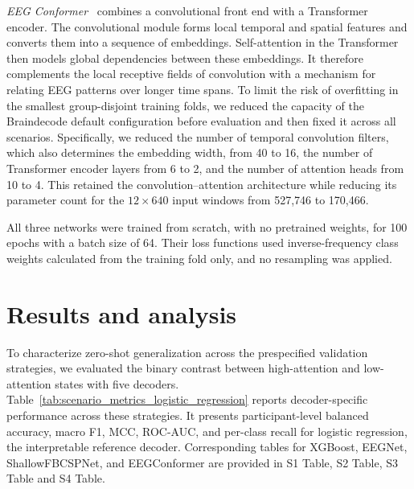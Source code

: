 \documentclass[10pt,letterpaper]{article}
\newcommand{\rev}[1]{#1}
\begin{document}
\rev{\textit{EEG Conformer}~\cite{song2023conformer} combines a convolutional
front end with a Transformer encoder. The convolutional module forms local
temporal and spatial features and converts them into a sequence of embeddings.
Self-attention in the Transformer then models global dependencies between these
embeddings. It therefore complements the local receptive fields of convolution
with a mechanism for relating EEG patterns over longer time spans. To limit the
risk of overfitting in the smallest group-disjoint training folds, we reduced
the capacity of the Braindecode default configuration before evaluation and
then fixed it across all scenarios. Specifically, we reduced the number of
temporal convolution filters, which also determines the embedding width, from
40 to 16, the number of Transformer encoder layers from 6 to 2, and the number
of attention heads from 10 to 4. This retained the convolution--attention
architecture while reducing its parameter count for the $12 \times 640$ input
windows from 527,746 to 170,466.}

\rev{All three networks were trained from scratch, with no pretrained weights,
for 100 epochs with a batch size of 64. Their loss functions used
inverse-frequency class weights calculated from the training fold only, and no
resampling was applied.}

\section*{Results and analysis}

To characterize zero-shot generalization across the prespecified validation
strategies, we evaluated the binary contrast between high-attention and
low-attention states with five decoders.
Table~\ref{tab:scenario_metrics_logistic_regression} reports decoder-specific
performance across these strategies. It presents
participant-level balanced accuracy, macro F1, MCC, ROC-AUC, and per-class
recall for logistic regression, the interpretable reference decoder.
Corresponding tables for XGBoost, EEGNet, ShallowFBCSPNet, and EEGConformer are
provided in S1 Table, S2 Table, S3 Table and S4 Table.
\end{document}
